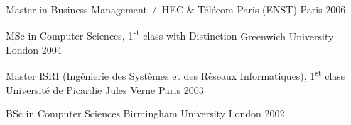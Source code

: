 


\begin{cventries}

  \cventry
    {Master in Business Management} %
    {\,/\, HEC \& Télécom Paris (ENST)} %
    {Paris} %
    {2006} %
    {}
    {}

  \cventry
    {MSc in Computer Sciences, 1\textsuperscript{st} class with Distinction} %
    {\hspace{0.5em}Greenwich University} %
    {London} %
    {2004} %
    {}
    {}

  \cventry
    {Master ISRI (Ingénierie des Systèmes et des Réseaux Informatiques), 1\textsuperscript{st} class} %
    {\hspace{0.5em}Université de Picardie Jules Verne} %
    {Paris} %
    {2003} %
    {}
    {}

  \cventry
    {BSc in Computer Sciences} %
    {\hspace{0.5em}Birmingham University} %
    {London} %
    {2002} %
    {}
    {}
\end{cventries}

